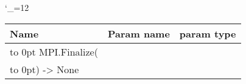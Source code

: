 \begingroup \catcode`\_=12 \tt
\begin{tabular}{lll}
\toprule
\textrm{Name}&\textrm{Param name}&\textrm{param type}\\
\midrule
\hbox to 0pt {MPI.Finalize(\hss}\\
\hbox to 0pt{) -> None\hss}\\
\bottomrule
\end{tabular}
\endgroup
